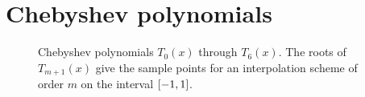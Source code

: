 \chapter{Chebyshev polynomials}

\begin{figure}[h]
  \centering
  \caption{\label{fig:chebyshev polynomials} Chebyshev polynomials $T_0(x)$ through $T_6(x)$.
    The roots of $T_{m + 1}(x)$ give the sample points for an interpolation scheme of order $m$ on the interval $\qty[-1, 1]$.
  }
\end{figure}

